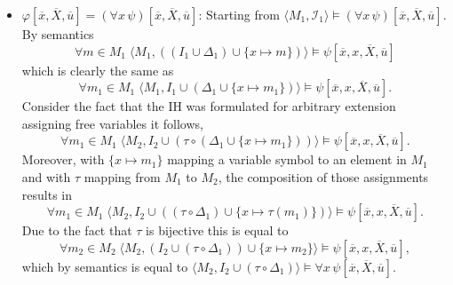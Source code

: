 \documentclass[11pt,a4paper]{article}
\begin{document}
\begin{itemize}[leftmargin=*]
\item  $\varphi[\overline{x}, \overline{X}, \overline{u}] = (\forall x \, \psi)[\overline{x}, \overline{X}, \overline{u}]$: Starting from $\langle M_1, \mathcal{I}_1 \rangle \models (\forall x \, \psi)[\overline{x}, \overline{X}, \overline{u}]$. By semantics  
\begin{equation*}
\forall m \in M_1 \; \langle M_1 , ((I_1 \cup \Delta_1) \cup \{x \mapsto m\}) \rangle \models \psi[\overline{x},x, \overline{X}, \overline{u}]
\end{equation*}
which is clearly the same as
\begin{equation*}
\forall m_1 \in M_1 \; \langle M_1 , I_1 \cup (\Delta_1 \cup \{x \mapsto m_1\}) \rangle \models \psi[\overline{x},x, \overline{X}, \overline{u}].
\end{equation*}
Consider the fact that the IH was formulated for arbitrary extension assigning free variables it follows,
 \begin{equation*}
\forall m_1 \in M_1 \;  \langle M_2 , I_2 \cup (\tau \circ (\Delta_1 \cup \{x \mapsto m_1\})) \rangle \models \psi[\overline{x},x, \overline{X}, \overline{u}].
\end{equation*} 
Moreover, with $\{x \mapsto m_1\}$ mapping a variable symbol to an element in $M_1$ and with $\tau$ mapping from $M_1$ to $M_2$, the composition of those assignments results in 
\begin{equation*}
\forall m_1 \in M_1 \;  \langle M_2 , I_2 \cup ((\tau \circ \Delta_1) \cup \{x \mapsto \tau (m_1)\}) \rangle \models \psi[\overline{x},x, \overline{X}, \overline{u}].
\end{equation*}
Due to the fact that $\tau$ is bijective this is equal to 
\begin{equation*}
\forall m_2 \in M_2 \;  \langle M_2 , (I_2 \cup (\tau \circ \Delta_1)) \cup \{x \mapsto m_2 \} \rangle \models \psi[\overline{x},x, \overline{X}, \overline{u}],
\end{equation*}
which by semantics is equal to $\langle M_2 , I_2 \cup (\tau \circ \Delta_1)\rangle \models \forall x \, \psi[\overline{x}, \overline{X}, \overline{u}]$. \\



\end{itemize}
\end{document}
